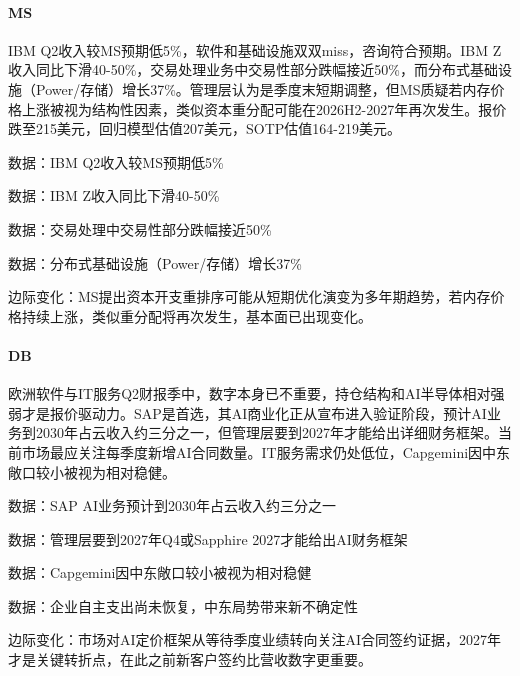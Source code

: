 \documentclass[11pt]{ctexart}
\begin{document}
\paragraph{MS} IBM Q2收入较MS预期低5\%，软件和基础设施双双miss，咨询符合预期。IBM Z收入同比下滑40-50\%，交易处理业务中交易性部分跌幅接近50\%，而分布式基础设施（Power/存储）增长37\%。管理层认为是季度末短期调整，但MS质疑若内存价格上涨被视为结构性因素，类似资本重分配可能在2026H2-2027年再次发生。报价跌至215美元，回归模型估值207美元，SOTP估值164-219美元。
{\small\color{refgray}数据：IBM Q2收入较MS预期低5\%\par}
{\small\color{refgray}数据：IBM Z收入同比下滑40-50\%\par}
{\small\color{refgray}数据：交易处理中交易性部分跌幅接近50\%\par}
{\small\color{refgray}数据：分布式基础设施（Power/存储）增长37\%\par}
{\small\color{refgray}边际变化：MS提出资本开支重排序可能从短期优化演变为多年期趋势，若内存价格持续上涨，类似重分配将再次发生，基本面已出现变化。\par}
\paragraph{DB} 欧洲软件与IT服务Q2财报季中，数字本身已不重要，持仓结构和AI半导体相对强弱才是报价驱动力。SAP是首选，其AI商业化正从宣布进入验证阶段，预计AI业务到2030年占云收入约三分之一，但管理层要到2027年才能给出详细财务框架。当前市场最应关注每季度新增AI合同数量。IT服务需求仍处低位，Capgemini因中东敞口较小被视为相对稳健。
{\small\color{refgray}数据：SAP AI业务预计到2030年占云收入约三分之一\par}
{\small\color{refgray}数据：管理层要到2027年Q4或Sapphire 2027才能给出AI财务框架\par}
{\small\color{refgray}数据：Capgemini因中东敞口较小被视为相对稳健\par}
{\small\color{refgray}数据：企业自主支出尚未恢复，中东局势带来新不确定性\par}
{\small\color{refgray}边际变化：市场对AI定价框架从等待季度业绩转向关注AI合同签约证据，2027年才是关键转折点，在此之前新客户签约比营收数字更重要。\par}
\end{document}
